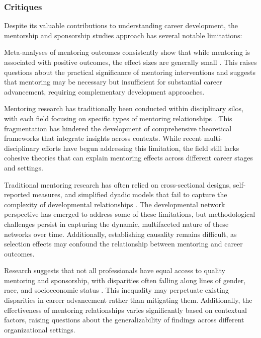 \documentclass[main.tex]{subfiles}
\begin{document}
\subsubsection{Critiques}

Despite its valuable contributions to understanding career development, the mentorship and sponsorship studies approach has several notable limitations:

Meta-analyses of mentoring outcomes consistently show that while mentoring is associated with positive outcomes, the effect sizes are generally small \parencite{dubois2011does}. This raises questions about the practical significance of mentoring interventions and suggests that mentoring may be necessary but insufficient for substantial career advancement, requiring complementary development approaches.

Mentoring research has traditionally been conducted within disciplinary silos, with each field focusing on specific types of mentoring relationships \parencite{dubois2011does}. This fragmentation has hindered the development of comprehensive theoretical frameworks that integrate insights across contexts. While recent multi-disciplinary efforts have begun addressing this limitation, the field still lacks cohesive theories that can explain mentoring effects across different career stages and settings.

Traditional mentoring research has often relied on cross-sectional designs, self-reported measures, and simplified dyadic models that fail to capture the complexity of developmental relationships \parencite{higgins2023celebrating, cdc2015network}. The developmental network perspective has emerged to address some of these limitations, but methodological challenges persist in capturing the dynamic, multifaceted nature of these networks over time. Additionally, establishing causality remains difficult, as selection effects may confound the relationship between mentoring and career outcomes.

Research suggests that not all professionals have equal access to quality mentoring and sponsorship, with disparities often falling along lines of gender, race, and socioeconomic status \parencite{alachkar2023sponsor, rsna2021mentorship}. This inequality may perpetuate existing disparities in career advancement rather than mitigating them. Additionally, the effectiveness of mentoring relationships varies significantly based on contextual factors, raising questions about the generalizability of findings across different organizational settings.
\end{document}

